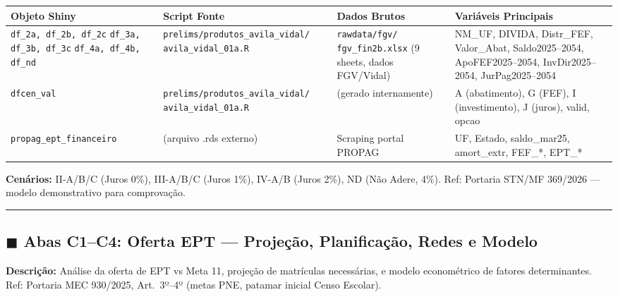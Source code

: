 \documentclass[10pt]{article}
\begin{document}
	\begin{center}
		\small
		\begin{tabular}{p{3.5cm}p{4.5cm}p{5cm}p{9cm}}
			\toprule
			\textbf{Objeto Shiny} & \textbf{Script Fonte} & \textbf{Dados Brutos} & \textbf{Variáveis Principais} \\
			\midrule
			\texttt{df\_2a, df\_2b, df\_2c} \newline \texttt{df\_3a, df\_3b, df\_3c} \newline \texttt{df\_4a, df\_4b, df\_nd} & \texttt{prelims/produtos\_avila\_vidal/} \newline \texttt{avila\_vidal\_01a.R} & \texttt{rawdata/fgv/} \newline \texttt{fgv\_fin2b.xlsx} \newline (9 sheets, dados FGV/Vidal) & NM\_UF, DIVIDA, Distr\_FEF, Valor\_Abat, Saldo2025--2054, ApoFEF2025--2054, InvDir2025--2054, JurPag2025--2054 \\
			\texttt{dfcen\_val} & \texttt{prelims/produtos\_avila\_vidal/} \newline \texttt{avila\_vidal\_01a.R} & (gerado internamente) & A (abatimento), G (FEF), I (investimento), J (juros), valid, opcao \\
			\texttt{propag\_ept\_financeiro} & (arquivo .rds externo) & Scraping portal PROPAG & UF, Estado, saldo\_mar25, amort\_extr, FEF\_*, EPT\_* \\
			\bottomrule
		\end{tabular}
	\end{center}
	
	\noindent\textbf{Cenários:} II-A/B/C (Juros 0\%), III-A/B/C (Juros 1\%), IV-A/B (Juros 2\%), ND (Não Adere, 4\%). Ref: Portaria STN/MF 369/2026 --- modelo demonstrativo para comprovação.
	
	\vspace{0.8em}
	\hrule
	\vspace{0.8em}
	
	\subsection*{\textcolor{tabC}{$\blacksquare$} Abas C1--C4: Oferta EPT --- Projeção, Planificação, Redes e Modelo}
	
	\noindent\textbf{Descrição:} Análise da oferta de EPT vs Meta 11, projeção de matrículas necessárias, e modelo econométrico de fatores determinantes. Ref: Portaria MEC 930/2025, Art.\ 3º--4º (metas PNE, patamar inicial Censo Escolar).
	
\end{document}
